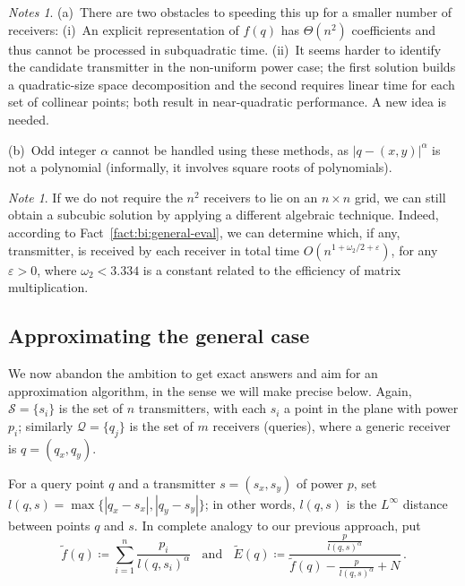 \documentclass[11pt]{article}
\theoremstyle{remark}
\newtheorem*{note}{Note}
\newtheorem*{notes}{Notes}
\def\Q{\mathcal{Q}}
\def\S{\mathcal{S}}
\def\ff{\tilde{f}}
\def\EE{\tilde{E}}
\let\eps\varepsilon
\begin{document}
\begin{notes}
  (a)~There are two obstacles to speeding this up for a smaller number of receivers: (i)~An explicit representation of $f(q)$ has $\Theta(n^2)$ coefficients and thus cannot be processed in subquadratic time.  (ii)~It seems harder to identify the candidate transmitter in the non-uniform power case; the first solution builds a quadratic-size space decomposition and the second requires linear time for each set of collinear points; both result in near-quadratic performance.  A new idea is needed.

  (b)~Odd integer $\alpha$ cannot be handled using these methods, as $|q-(x,y)|^\alpha$ is not a polynomial (informally, it involves square roots of polynomials).
\end{notes}

\begin{note}
  If we do not require the $n^2$ receivers to lie on an $n\times n$ grid, we can still obtain a subcubic solution by applying a different algebraic technique. Indeed, according to Fact~\ref{fact:bi:general-eval}, we can determine which, if any, transmitter, is received by each receiver in total time $O(n^{1+\omega_2/2+\eps})$, for any $\eps>0$, where $\omega_2<3.334$ is a constant related to the efficiency of matrix multiplication.    
\end{note}

\subsection{Approximating the general case}
\label{sec:approx}



We now abandon the ambition to get exact answers and aim
for an approximation algorithm, in the sense we will make precise
below.  Again, $\S=\{s_i\}$ is the set of $n$ transmitters, with each
$s_i$ a point in the plane with power $p_i$; similarly $\Q=\{q_j\}$ is the
set of $m$ receivers (queries), where a generic receiver is $q=(q_x,q_y)$.



For a query point $q$ and a transmitter $s=(s_x,s_y)$ of power $p$, set $l(q,s) = \max\{|q_x
- s_x|, |q_y - s_y|\}$; in other words, $l(q,s)$ is the $L^\infty$
distance between points $q$ and $s$.  In complete analogy to our
previous approach,
put
\[
\ff(q) \coloneqq \sum_{i=1}^n\frac{p_i}{l(q,s_i)^\alpha} \ \ \ \ \mbox{and} \ \ \ \
\EE(q) \coloneqq \frac{\frac{p}{l(q,s)^\alpha}}{\ff(q) - \frac{p}{l(q,s)^\alpha} + N} \, .
\]
\end{document}
